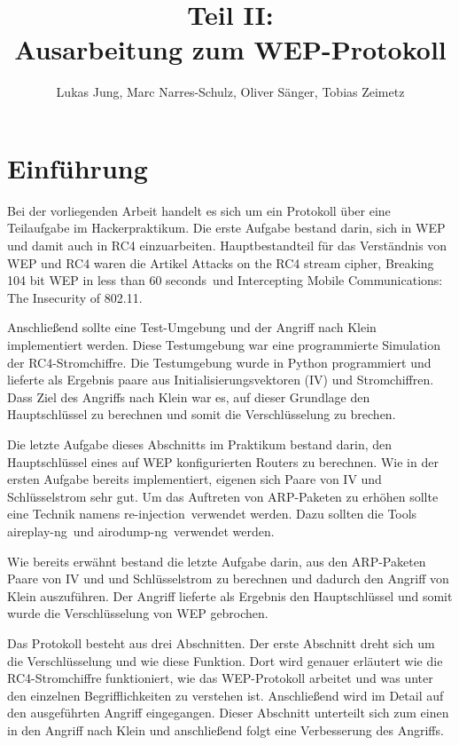 \documentclass[10pt,a4paper]{article}
\title{Teil II:\\Ausarbeitung zum WEP-Protokoll}
\author{Lukas Jung, Marc Narres-Schulz, Oliver Sänger, Tobias Zeimetz}
\begin{document}
\maketitle
\tableofcontents
\newpage

\section{Einführung}
Bei der vorliegenden Arbeit handelt es sich um ein Protokoll über eine Teilaufgabe im \glqq Hackerpraktikum\grqq. Die erste Aufgabe bestand darin, sich in WEP und damit auch in RC4 einzuarbeiten. Hauptbestandteil für das Verständnis von WEP und RC4 waren die Artikel \glqq Attacks on the RC4 stream cipher\grqq \cite{Kle08}, \glqq Breaking 104 bit WEP in less than 60 seconds\grqq \cite{TWP07}\ und \glqq Intercepting Mobile Communications: The Insecurity of 802.11\grqq \cite{BGW01}.

Anschließend sollte eine Test-Umgebung und der Angriff nach Klein implementiert werden. Diese Testumgebung war eine programmierte Simulation der RC4-Stromchiffre. Die Testumgebung wurde in Python programmiert und lieferte als Ergebnis paare aus Initialisierungsvektoren (IV) und Stromchiffren. Dass Ziel des Angriffs nach Klein war es, auf dieser Grundlage den Hauptschlüssel zu berechnen und somit die Verschlüsselung zu brechen. 

Die letzte Aufgabe dieses Abschnitts im Praktikum bestand darin, den Hauptschlüssel eines auf WEP konfigurierten Routers zu berechnen. Wie in der ersten Aufgabe bereits implementiert, eigenen sich Paare von IV und Schlüsselstrom sehr gut. Um das Auftreten von ARP-Paketen zu erhöhen sollte eine Technik namens \glqq re-injection\grqq \ verwendet werden.  Dazu sollten die Tools \glqq aireplay-ng\grqq \ und \glqq airodump-ng\grqq \ verwendet werden.

Wie bereits erwähnt bestand die letzte Aufgabe darin, aus den ARP-Paketen Paare von IV und und Schlüsselstrom zu berechnen und dadurch den Angriff von Klein auszuführen. Der Angriff lieferte als Ergebnis den Hauptschlüssel und somit wurde die Verschlüsselung von WEP gebrochen.

Das Protokoll besteht aus drei Abschnitten. Der erste Abschnitt dreht sich um die Verschlüsselung und wie diese Funktion. Dort wird genauer erläutert wie die RC4-Stromchiffre funktioniert, wie das WEP-Protokoll arbeitet und was unter den einzelnen Begrifflichkeiten zu verstehen ist. Anschließend wird im Detail auf den ausgeführten Angriff eingegangen. Dieser Abschnitt unterteilt sich zum einen in den Angriff nach Klein und anschließend folgt eine Verbesserung des Angriffs. 
\end{document}
